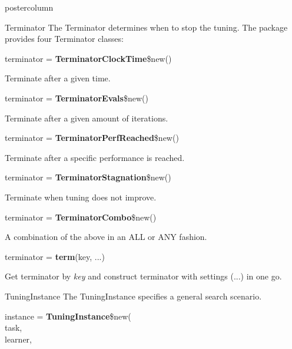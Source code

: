 \documentclass{beamer}
\newlength{\columnheight} %
\begin{document}
\begin{frame}[fragile]{}
\begin{columns}
\begin{column}{.245\textwidth}
\begin{beamercolorbox}[center]{postercolumn}
				\begin{minipage}{.98\textwidth}
					\parbox[t][\columnheight]{\textwidth}{
						\begin{myblock}{Terminator}
						The Terminator determines when to stop the tuning. The package provides four Terminator classes:
						\\
						\begin{codebox}
							terminator = \textbf{TerminatorClockTime}\$new()
						\end{codebox}
						Terminate after a given time.
						\\
						\begin{codebox}
							terminator = \textbf{TerminatorEvals}\$new()
						\end{codebox}
						Terminate after a given amount of iterations. 
						\\
						\begin{codebox}
							terminator = \textbf{TerminatorPerfReached}\$new()
						\end{codebox}
						Terminate after a specific performance is reached.  
						\\
						\begin{codebox}
							terminator = \textbf{TerminatorStagnation}\$new()
						\end{codebox}
						Terminate when tuning does not improve.
						\\
						\begin{codebox}
							terminator = \textbf{TerminatorCombo}\$new()
						\end{codebox}
						A combination of the above in an ALL or ANY fashion.
						\\
						\begin{codebox}
							terminator = \textbf{term}(key, ...)
						\end{codebox}
						Get terminator by \textit{key} and construct terminator with settings (...) in one go. 
					\end{myblock}	
				\begin{myblock}{TuningInstance}
					The TuningInstance specifies a general search scenario.
					\\
					\begin{codeboxmultiline}[width=18cm]
						instance = \textbf{TuningInstance}\$new(\\
						\hspace*{1ex}task,\\
						\hspace*{1ex}learner,\\

\end{codeboxmultiline}
\end{myblock}}
\end{minipage}
\end{beamercolorbox}
\end{column}
\end{columns}
\end{frame}
\end{document}
